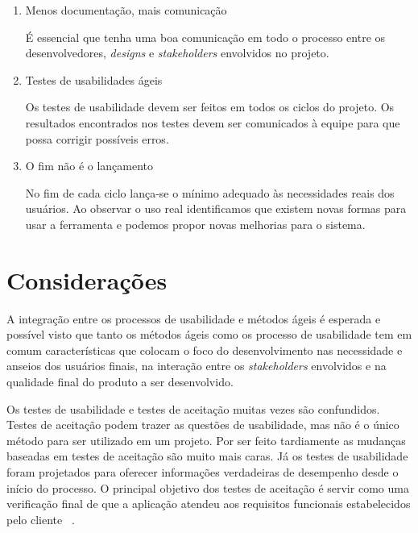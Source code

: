 \begin{enumerate}
	
\item Menos documentação, mais comunicação

	É essencial que tenha uma boa comunicação em todo o processo entre os desenvolvedores, \emph{designs} e \textit{stakeholders} envolvidos no projeto.



\item Testes de usabilidades ágeis

	Os testes de usabilidade devem ser feitos em todos os ciclos do projeto.  Os resultados encontrados nos testes devem ser comunicados à equipe para que possa corrigir possíveis erros.

\item O fim não é o lançamento

	No fim de cada ciclo lança-se o mínimo adequado às necessidades reais dos usuários. Ao observar o uso real identificamos que existem novas formas para usar a ferramenta e podemos propor novas melhorias para o sistema. 
	
\end{enumerate}


\section{Considerações}

	A integração entre os processos de usabilidade e métodos ágeis é esperada e possível visto que tanto os métodos ágeis como os processo de usabilidade tem em comum características que colocam o foco do desenvolvimento nas necessidade e anseios dos usuários finais, na interação entre os \textit{stakeholders} envolvidos e na qualidade final do produto a ser desenvolvido.
	
	Os testes de usabilidade e testes de aceitação muitas vezes são confundidos. Testes de aceitação podem trazer as questões de usabilidade, mas não é o único método para ser utilizado em um projeto. Por ser feito tardiamente as mudanças baseadas em testes de aceitação são muito mais caras. Já os testes de usabilidade foram projetados para oferecer informações verdadeiras de desempenho desde o início do processo.  
%
O principal objetivo dos testes de aceitação é servir como uma verificação final de que a aplicação atendeu aos requisitos funcionais estabelecidos pelo cliente ~\cite{preece2007}.





